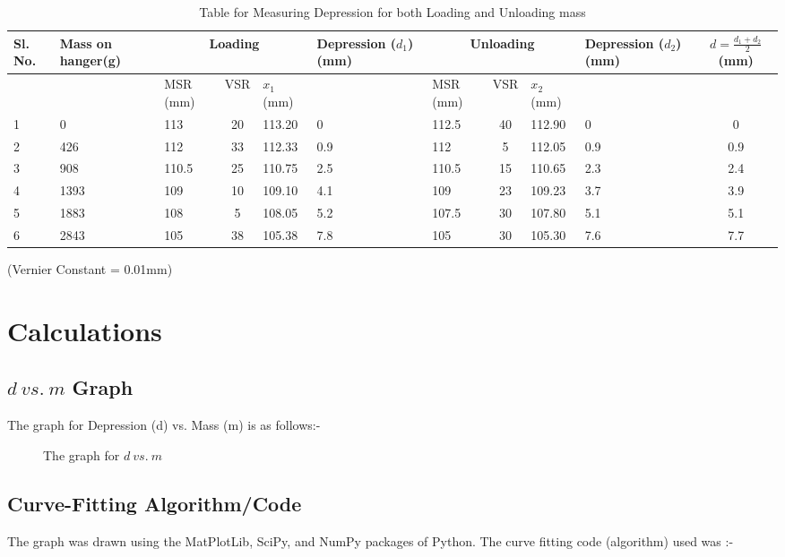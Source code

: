 \documentclass[12pt]{article}
\begin{document}
			\begin{table}[H]
		\centering
		\def\arraystretch{1.5}
		\caption{Table	for	Measuring	Depression	for	both	Loading	and	Unloading	mass }
		\begin{tabular}{|p{0.3in}||p{0.6in}|p{0.3in}|c|p{0.4in}|p{0.6in}|p{0.3in}|c|p{0.4in}|p{0.8in}|c|}
			\hline
			Sl. No.&Mass on hanger(g)&\multicolumn{3}{|c|}{Loading}&Depression ($d_{1}$)(mm)&\multicolumn{3}{|c|}{Unloading}&Depression ($d_{2}$)(mm)&$d = \frac{d_{1}+d_{2}}{2}$(mm)\\
			\hline
			&&MSR (mm)&VSR&$x_{1}$ (mm)&&MSR (mm)&VSR&$x_{2}$ (mm)&&\\
			\hline
			\hline
			1&0&113&20&113.20&0&112.5&40&112.90&0&0\\
			\hline
			2&426&112&33&112.33&0.9&112&5&112.05&0.9&0.9\\
			\hline
			3&908&110.5&25&110.75&2.5&110.5&15&110.65&2.3&2.4\\
			\hline
			4&1393&109&10&109.10&4.1&109&23&109.23&3.7&3.9\\
			\hline
			5&1883&108&5&108.05&5.2&107.5&30&107.80&5.1&5.1\\
			\hline
			6&2843&105&38&105.38&7.8&105&30&105.30&7.6&7.7\\
			\hline
		\end{tabular}
		(Vernier Constant = 0.01mm)
		\label{tab:final}
	\end{table}

	\section{Calculations}
	\label{sec:calc}
	
	\subsection{$d\ vs.\ m$ Graph}
	The graph for Depression (d) vs. Mass (m) is as follows:-
		
		\begin{figure}[H]
			\centering
			\caption{The graph for $d\ vs.\ m$}
			\label{figure:graph}
		\end{figure}
	
	\pagebreak
	
	\subsection{Curve-Fitting Algorithm/Code}
	
	The graph was drawn using the MatPlotLib, SciPy, and NumPy packages of Python.
	The curve fitting code (algorithm) used was :-\\[10pt]
	
\end{document}
